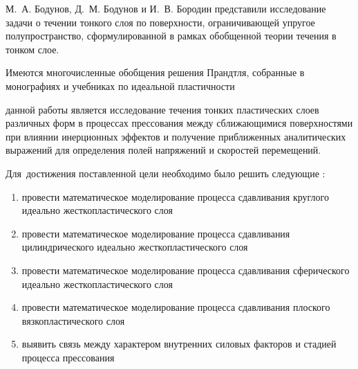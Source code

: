 М.~А. Бодунов, Д.~М. Бодунов и И.~В. Бородин \autocite{Bodunov:2013} представили исследование задачи о течении тонкого слоя по поверхности, ограничивающей упругое полупространство, сформулированной в рамках обобщенной теории течения в тонком слое.

Имеются многочисленные обобщения решения Прандтля, собранные в монографиях и учебниках по идеальной пластичности \autocite{Bikovcev:1998, Browman:1965, Gromov:1978, Gubkin:1959, Hill:1956, Ishlinsky:2001, Ivlev:2001, Ivlev:2002, Kachanov:1969, Kolmogorov:2001, Korolev:1969, Mihin:1968, Nadai:1954, Pavlov:1950, Perlin:1964, Prager:1956, Sokolovskiy:1969, Storozhev:1977, Tarnovsky:1963, Tomlenov:1963, Tomlenov:1972, Tomsen:1965, Tselikov:1965, Tselikov:1965, Unksov:1955, Zadoyan:1992}

\ifsynopsis
\else
\fi


{\aim} данной работы является исследование течения тонких пластических слоев различных форм в процессах прессования между сближающимися поверхностями при влиянии инерционных эффектов и получение приближенных аналитических выражений для определения полей напряжений и скоростей перемещений.

Для~достижения поставленной цели необходимо было решить следующие {\tasks}:
\begin{enumerate}[beginpenalty=10000] %
    \item провести математическое моделирование процесса сдавливания круглого идеально жесткопластического слоя
    \item провести математическое моделирование процесса сдавливания цилиндрического идеально жесткопластического слоя
    \item провести математическое моделирование процесса сдавливания сферического идеально жесткопластического слоя
    \item провести математическое моделирование процесса сдавливания плоского вязкопластического слоя
    \item выявить связь между характером внутренних силовых факторов и стадией процесса прессования
\end{enumerate}


